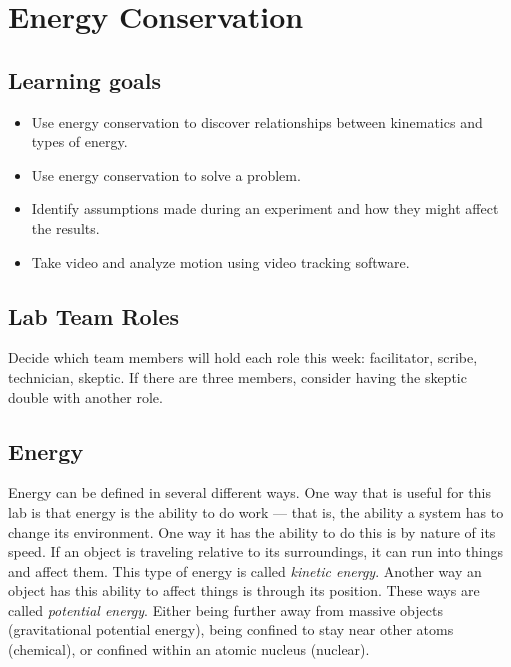 \chapter{Energy Conservation}

\section{Learning goals}

\begin{itemize}
	\item Use energy conservation to discover relationships between kinematics and types of energy.
	
	\item Use energy conservation to solve a problem.
	
	\item Identify assumptions made during an experiment and how they might affect the results.
	
	\item Take video and analyze motion using video tracking software.
\end{itemize}

\section{Lab Team Roles}

Decide which team members will hold each role this week: facilitator, scribe, technician, skeptic. If there are three members, consider having the skeptic double with another role.

\section{Energy}

Energy can be defined in several different ways. One way that is useful for this lab is that energy is the ability to do work --- that is, the ability a system has to change its environment. One way it has the ability to do this is by nature of its speed. If an object is traveling relative to its surroundings, it can run into things and affect them. This type of energy is called \textit{kinetic energy}. Another way an object has this ability to affect things is through its position. These ways are called \textit{potential energy}. Either being further away from massive objects (gravitational potential energy), being confined to stay near other atoms (chemical), or confined within an atomic nucleus (nuclear).

